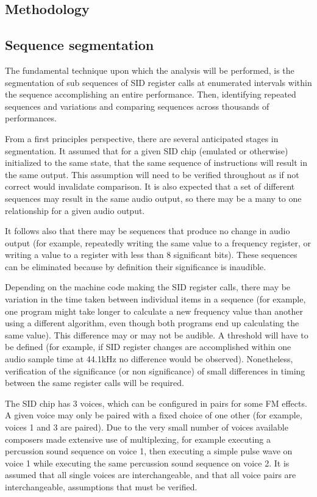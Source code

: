 \documentclass[10pt]{article}
\begin{document}
\begin{multicols*}{2}
  \section{Methodology}

  \subsection{Sequence segmentation}

  The fundamental technique upon which the analysis will be performed,
  is the segmentation of sub sequences of SID register calls at
  enumerated intervals within the sequence accomplishing an entire
  performance. Then, identifying repeated sequences and variations
  and comparing sequences across thousands of performances.

  From a first principles perspective, there are several anticipated
  stages in segmentation. It assumed that for a given SID chip
  (emulated or otherwise) initialized to the same state, that the same
  sequence of instructions will result in the same output. This
  assumption will need to be verified throughout as if not correct
  would invalidate comparison. It is also expected that a set of
  different sequences may result in the same audio output, so there
  may be a many to one relationship for a given audio output.

  It follows also that there may be sequences that produce no change
  in audio output (for example, repeatedly writing the same value to a
  frequency register, or writing a value to a register with less than 8
  significant bits). These sequences can be eliminated because by definition
  their significance is inaudible.

  Depending on the machine code making the SID register calls,
  there may be variation in the time taken between individual items in
  a sequence (for example, one program might take longer to calculate
  a new frequency value than another using a different algorithm, even
  though both programs end up calculating the same value). This
  difference may or may not be audible. A threshold will have to be
  defined (for example, if SID register changes are accomplished within
  one audio sample time at 44.1kHz no difference would be observed).
  Nonetheless, verification of the significance (or non significance)
  of small differences in timing between the same register calls
  will be required.

  The SID chip has 3 voices, which can be configured in pairs for some
  FM effects. A given voice may only be paired with a fixed choice of one
  other (for example, voices 1 and 3 are paired). Due to the very small
  number of voices available composers made extensive use of multiplexing,
  for example executing a percussion sound sequence on voice 1, then executing
  a simple pulse wave on voice 1 while executing the same percussion sound
  sequence on voice 2. It is assumed that all single voices are interchangeable,
  and that all voice pairs are interchangeable, assumptions that must be
  verified.


\end{multicols*}
\end{document}
